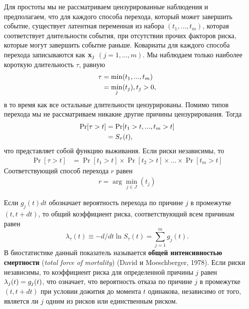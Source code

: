 Для простоты мы не рассматриваем цензурированные наблюдения и предполагаем, что для каждого способа перехода, который может завершить событие, существует латентная переменная из набора $(t_1, ..., t_m)$, которая соответствует длительности события, при отсутствии прочих факторов риска, которые могут завершить событие раньше. Ковариаты для каждого способа перехода записываются как $\mathbf{x}_j$ $(j = 1, ..., m)$. Мы наблюдаем только наиболее короткую длительность $\tau$, равную
    \begin{align}
    \label{eq:19.1}
    \tau    &= \min(t_1, ..., t_m)\\
            &= \min_{j}(t_j), t_j > 0, \notag
    \end{align}
в то время как все остальные длительности цензурированы. Помимо типов перехода мы не рассматриваем никакие другие причины цензурирования. Тогда
    \begin{align}
    \label{eq:19.2}
    \Pr[\tau > t]   &= \Pr[t_1 > t, ...,  t_m > t]\\
                    &= S_{\tau}(t), \notag
    \end{align}
что представляет собой функцию выживания. Если риски независимы, то
    \begin{align}
    \label{eq:19.3}
    \Pr [\tau > t]  &= \Pr [t_1 > t] \times \Pr [t_2 > t] \times ... \times \Pr [t_m > t]
    \end{align}
Соответствующий способ перехода $r$ равен
    \begin{align}
    \label{eq:19.4}
    r = \arg \min_{j \in J}(t_j)
    \end{align}

Если $g_j(t)dt$ обозначает вероятность перехода по причине $j$ в промежутке $(t, t + dt)$, то общий коэффициент риска, соответствующий всем причинам равен
    $$\lambda_\tau(t) \equiv - d/dt \ln S_\tau(t) = \sum_{j=1}^m g_j(t).$$
В биостатистике данный показатель называется \textbf{общей интенсивностью смертности} (\textit{total force of mortality}) (David и Moeschberger, 1978). Если риски независимы, то коэффициент риска для определенной причины $j$ равен $\lambda_j(t) = g_j(t)$, что означает, что вероятность отказа по причине $j$ в промежутке $(t, t + dt)$ при условии дожития до момента $t$ одинакова, независимо от того, является ли $j$ одним из рисков или единственным риском.


